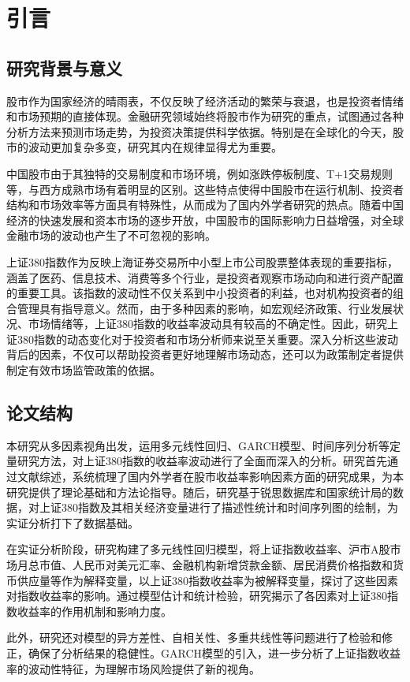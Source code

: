 \documentclass[12pt, a4paper]{article}
\numberwithin{equation}{section}
\begin{document}
\section{引言}
\subsection{研究背景与意义}
股市作为国家经济的晴雨表，不仅反映了经济活动的繁荣与衰退，也是投资者情绪和市场预期的直接体现。金融研究领域始终将股市作为研究的重点，试图通过各种分析方法来预测市场走势，为投资决策提供科学依据。特别是在全球化的今天，股市的波动更加复杂多变，研究其内在规律显得尤为重要。

中国股市由于其独特的交易制度和市场环境，例如涨跌停板制度、T+1交易规则等，与西方成熟市场有着明显的区别。这些特点使得中国股市在运行机制、投资者结构和市场效率等方面具有特殊性，从而成为了国内外学者研究的热点。随着中国经济的快速发展和资本市场的逐步开放，中国股市的国际影响力日益增强，对全球金融市场的波动也产生了不可忽视的影响。

上证380指数作为反映上海证券交易所中小型上市公司股票整体表现的重要指标，涵盖了医药、信息技术、消费等多个行业，是投资者观察市场动向和进行资产配置的重要工具。该指数的波动性不仅关系到中小投资者的利益，也对机构投资者的组合管理具有指导意义。然而，由于多种因素的影响，如宏观经济政策、行业发展状况、市场情绪等，上证380指数的收益率波动具有较高的不确定性。因此，研究上证380指数的动态变化对于投资者和市场分析师来说至关重要。深入分析这些波动背后的因素，不仅可以帮助投资者更好地理解市场动态，还可以为政策制定者提供制定有效市场监管政策的依据。

\subsection{论文结构}
本研究从多因素视角出发，运用多元线性回归、GARCH模型、时间序列分析等定量研究方法，对上证380指数的收益率波动进行了全面而深入的分析。研究首先通过文献综述，系统梳理了国内外学者在股市收益率影响因素方面的研究成果，为本研究提供了理论基础和方法论指导。随后，研究基于锐思数据库和国家统计局的数据，对上证380指数及其相关经济变量进行了描述性统计和时间序列图的绘制，为实证分析打下了数据基础。

在实证分析阶段，研究构建了多元线性回归模型，将上证指数收益率、沪市A股市场月总市值、人民币对美元汇率、金融机构新增贷款金额、居民消费价格指数和货币供应量等作为解释变量，以上证380指数收益率为被解释变量，探讨了这些因素对指数收益率的影响。通过模型估计和统计检验，研究揭示了各因素对上证380指数收益率的作用机制和影响力度。

此外，研究还对模型的异方差性、自相关性、多重共线性等问题进行了检验和修正，确保了分析结果的稳健性。GARCH模型的引入，进一步分析了上证指数收益率的波动性特征，为理解市场风险提供了新的视角。
\end{document}
